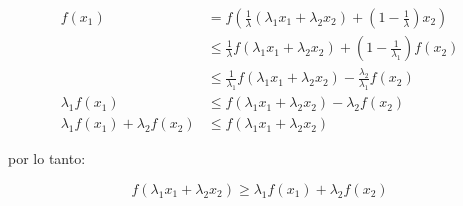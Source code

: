 \begin{align*}
    f(x_1)                              & = f\left ( \frac{1}{\lambda} (\lambda_1 x_1 + \lambda_2 x_2) + \left (1-\frac{1}{\lambda} \right ) x_2\right ) \\
                                        & \leq \frac{1}{\lambda} f(\lambda_1 x_1 + \lambda_2 x_2) + \left (1 - \frac{1}{\lambda_1} \right ) f(x_2)       \\
                                        & \leq \frac{1}{\lambda_1} f(\lambda_1 x_1 + \lambda_2 x_2) - \frac{\lambda_2}{\lambda_1} f(x_2)                 \\
    \lambda_1 f(x_1)                    & \leq f(\lambda_1 x_1 + \lambda_2 x_2) - \lambda_2 f(x_2)                                                       \\
    \lambda_1 f(x_1) + \lambda_2 f(x_2) & \leq f(\lambda_1 x_1 + \lambda_2 x_2)
\end{align*}

por lo tanto:

\begin{equation*}
    f(\lambda_1 x_1 + \lambda_2 x_2) \geq \lambda_1 f(x_1) + \lambda_2 f(x_2)
\end{equation*}
